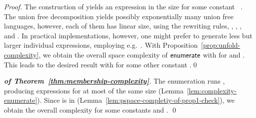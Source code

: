 \documentclass[envcountsame]{llncs}
\newcommand{\setenumeration}{\ensuremath{{\sf enumerate}}\xspace}
\begin{document}
\begin{lemma}[ runs in
  ]
  \label{lem:complexity-enumerate}
\end{lemma}

\begin{proof}The construction of  yields an expression in
  the size  for some constant
  ~\cite{rewriting}.
The union free decomposition yields possibly exponentially many
  union free languages, however, each of them has linear size, using
  the rewriting rules, , ,
  , and .
In practical implementations, however, one might prefer to generate
  less but larger individual expressions, employing e.g.~\cite{decomposition}. 
With Proposition~\ref{prop:unfold-complexity}, we obtain the overall
  space complexity of \setenumeration with  for  and
  .
This leads to the desired result with  for some other constant
  .\qed
\end{proof}


\begin{proof}[\textbf{of Theorem~\ref{thm:membership-complexity}}]
  The enumeration runs , producing expressions for
   at most of the same size
  (Lemma~\ref{lem:complexity-enumerate}).
Since  is in 
  (Lemma~\ref{lem:pspace-completiy-of-prop1-check}), we obtain the
  overall complexity  for some
  constants  and . \qed
\end{proof}
 
\end{document}

